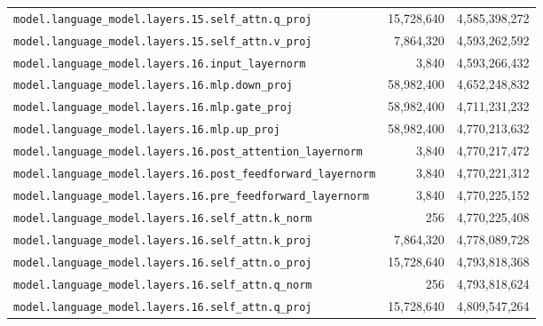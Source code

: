 \documentclass[10pt,a4paper]{article}
\theoremstyle{definition}
\begin{document}
\begin{appendices}
\begin{longtable}{p{9.5cm}rr}
\texttt{model.\allowbreak{}language\_model.\allowbreak{}layers.\allowbreak{}15.\allowbreak{}self\_attn.\allowbreak{}q\_proj} & 15,728,640 & 4,585,398,272 \\
\texttt{model.\allowbreak{}language\_model.\allowbreak{}layers.\allowbreak{}15.\allowbreak{}self\_attn.\allowbreak{}v\_proj} & 7,864,320 & 4,593,262,592 \\
\texttt{model.\allowbreak{}language\_model.\allowbreak{}layers.\allowbreak{}16.\allowbreak{}input\_layernorm} & 3,840 & 4,593,266,432 \\
\texttt{model.\allowbreak{}language\_model.\allowbreak{}layers.\allowbreak{}16.\allowbreak{}mlp.\allowbreak{}down\_proj} & 58,982,400 & 4,652,248,832 \\
\texttt{model.\allowbreak{}language\_model.\allowbreak{}layers.\allowbreak{}16.\allowbreak{}mlp.\allowbreak{}gate\_proj} & 58,982,400 & 4,711,231,232 \\
\texttt{model.\allowbreak{}language\_model.\allowbreak{}layers.\allowbreak{}16.\allowbreak{}mlp.\allowbreak{}up\_proj} & 58,982,400 & 4,770,213,632 \\
\texttt{model.\allowbreak{}language\_model.\allowbreak{}layers.\allowbreak{}16.\allowbreak{}post\_attention\_layernorm} & 3,840 & 4,770,217,472 \\
\texttt{model.\allowbreak{}language\_model.\allowbreak{}layers.\allowbreak{}16.\allowbreak{}post\_feedforward\_layernorm} & 3,840 & 4,770,221,312 \\
\texttt{model.\allowbreak{}language\_model.\allowbreak{}layers.\allowbreak{}16.\allowbreak{}pre\_feedforward\_layernorm} & 3,840 & 4,770,225,152 \\
\texttt{model.\allowbreak{}language\_model.\allowbreak{}layers.\allowbreak{}16.\allowbreak{}self\_attn.\allowbreak{}k\_norm} & 256 & 4,770,225,408 \\
\texttt{model.\allowbreak{}language\_model.\allowbreak{}layers.\allowbreak{}16.\allowbreak{}self\_attn.\allowbreak{}k\_proj} & 7,864,320 & 4,778,089,728 \\
\texttt{model.\allowbreak{}language\_model.\allowbreak{}layers.\allowbreak{}16.\allowbreak{}self\_attn.\allowbreak{}o\_proj} & 15,728,640 & 4,793,818,368 \\
\texttt{model.\allowbreak{}language\_model.\allowbreak{}layers.\allowbreak{}16.\allowbreak{}self\_attn.\allowbreak{}q\_norm} & 256 & 4,793,818,624 \\
\texttt{model.\allowbreak{}language\_model.\allowbreak{}layers.\allowbreak{}16.\allowbreak{}self\_attn.\allowbreak{}q\_proj} & 15,728,640 & 4,809,547,264 \\

\end{longtable}
\end{appendices}
\end{document}
